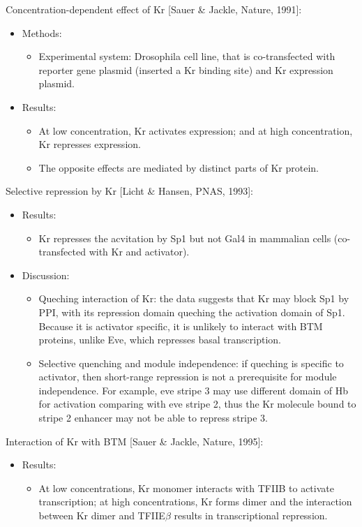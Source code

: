 \documentclass{report}
\begin{document}
\begin{enumerate}
	Concentration-dependent effect of Kr [Sauer \& Jackle, Nature, 1991]:
	\begin{itemize}
		\item Methods: 
		\begin{itemize}
			\item Experimental system: Drosophila cell line, that is co-transfected with reporter gene plasmid (inserted a Kr binding site) and Kr expression plasmid. 
		\end{itemize}
		
		\item Results:
		\begin{itemize}
			\item At low concentration, Kr activates expression; and at high concentration, Kr represses expression. 
			\item The opposite effects are mediated by distinct parts of Kr protein. 
		\end{itemize}
		
	\end{itemize}
	
	Selective repression by Kr [Licht \& Hansen, PNAS, 1993]:
	\begin{itemize}
		\item Results: 
		\begin{itemize}
			\item Kr represses the acvitation by Sp1 but not Gal4 in mammalian cells (co-transfected with Kr and activator). 
		\end{itemize}
		
		\item Discussion: 
		\begin{itemize}
			\item Queching interaction of Kr: the data suggests that Kr may block Sp1 by PPI, with its repression domain queching the activation domain of Sp1. Because it is activator specific, it is unlikely to interact with BTM proteins, unlike Eve, which represses basal transcription. 
			\item Selective quenching and module independence: if queching is specific to activator, then short-range repression is not a prerequisite for module independence. For example, eve stripe 3 may use different domain of Hb for activation comparing with eve stripe 2, thus the Kr molecule bound to stripe 2 enhancer may not be able to repress stripe 3. 
		\end{itemize}
	\end{itemize}
	
	Interaction of Kr with BTM [Sauer \& Jackle, Nature, 1995]:
	\begin{itemize}
		\item Results:
		\begin{itemize}
			\item At low concentrations, Kr monomer interacts with TFIIB to activate transcription; at high concentrations, Kr forms dimer and the interaction between Kr dimer and TFIIE$\beta$ results in transcriptional repression. 
		\end{itemize}
		

\end{itemize}
\end{enumerate}
\end{document}
